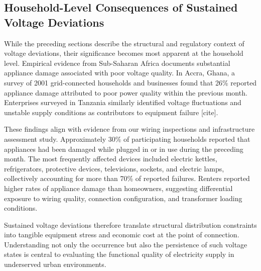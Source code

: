 \documentclass[review]{elsarticle}
\begin{document}
\subsection{Household-Level Consequences of Sustained Voltage Deviations}

While the preceding sections describe the structural and regulatory context of voltage deviations, their significance becomes most apparent at the household level. Empirical evidence from Sub-Saharan Africa documents substantial appliance damage associated with poor voltage quality. In Accra, Ghana, a survey of 2001 grid-connected households and businesses found that 26\% reported appliance damage attributed to poor power quality within the previous month. Enterprises surveyed in Tanzania similarly identified voltage fluctuations and unstable supply conditions as contributors to equipment failure [cite].

These findings align with evidence from our wiring inspections and infrastructure assessment study. Approximately 30\% of participating households reported that appliances had been damaged while plugged in or in use during the preceding month. The most frequently affected devices included electric kettles, refrigerators, protective devices, televisions, sockets, and electric lamps, collectively accounting for more than 70\% of reported failures. Renters reported higher rates of appliance damage than homeowners, suggesting differential exposure to wiring quality, connection configuration, and transformer loading conditions.

Sustained voltage deviations therefore translate structural distribution constraints into tangible equipment stress and economic cost at the point of connection. Understanding not only the occurrence but also the persistence of such voltage states is central to evaluating the functional quality of electricity supply in underserved urban environments.




\clearpage
\FloatBarrier
\end{document}
